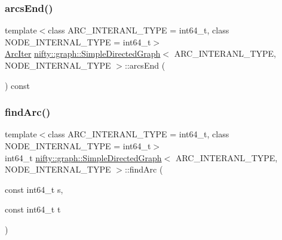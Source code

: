 \mbox{\label{classnifty_1_1graph_1_1SimpleDirectedGraph_afce1278803a49cc966299d0b673bb077}} 
\subsubsection{\texorpdfstring{arcs\+End()}{arcsEnd()}}
{\footnotesize\ttfamily template$<$class A\+R\+C\+\_\+\+I\+N\+T\+E\+R\+A\+N\+L\+\_\+\+T\+Y\+PE  = int64\+\_\+t, class N\+O\+D\+E\+\_\+\+I\+N\+T\+E\+R\+N\+A\+L\+\_\+\+T\+Y\+PE  = int64\+\_\+t$>$ \\
\hyperlink{classnifty_1_1graph_1_1SimpleDirectedGraph_ad555ff3a9746915c60858cd7d55ae342}{Arc\+Iter} \hyperlink{classnifty_1_1graph_1_1SimpleDirectedGraph}{nifty\+::graph\+::\+Simple\+Directed\+Graph}$<$ A\+R\+C\+\_\+\+I\+N\+T\+E\+R\+A\+N\+L\+\_\+\+T\+Y\+PE, N\+O\+D\+E\+\_\+\+I\+N\+T\+E\+R\+N\+A\+L\+\_\+\+T\+Y\+PE $>$\+::arcs\+End (\begin{DoxyParamCaption}{ }\end{DoxyParamCaption}) const\hspace{0.3cm}{\ttfamily [inline]}}

\mbox{\label{classnifty_1_1graph_1_1SimpleDirectedGraph_aad6e2efc56adee1f93dcb7a7c1528851}} 
\subsubsection{\texorpdfstring{find\+Arc()}{findArc()}}
{\footnotesize\ttfamily template$<$class A\+R\+C\+\_\+\+I\+N\+T\+E\+R\+A\+N\+L\+\_\+\+T\+Y\+PE  = int64\+\_\+t, class N\+O\+D\+E\+\_\+\+I\+N\+T\+E\+R\+N\+A\+L\+\_\+\+T\+Y\+PE  = int64\+\_\+t$>$ \\
int64\+\_\+t \hyperlink{classnifty_1_1graph_1_1SimpleDirectedGraph}{nifty\+::graph\+::\+Simple\+Directed\+Graph}$<$ A\+R\+C\+\_\+\+I\+N\+T\+E\+R\+A\+N\+L\+\_\+\+T\+Y\+PE, N\+O\+D\+E\+\_\+\+I\+N\+T\+E\+R\+N\+A\+L\+\_\+\+T\+Y\+PE $>$\+::find\+Arc (\begin{DoxyParamCaption}\item[{const int64\+\_\+t}]{s,  }\item[{const int64\+\_\+t}]{t }\end{DoxyParamCaption})\hspace{0.3cm}{\ttfamily [inline]}}

